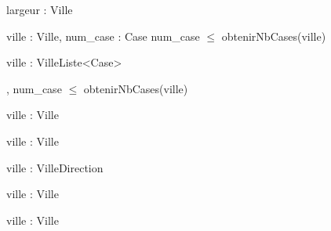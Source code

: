 \begin{algorithme}
        {largeur : \naturelNonNul}{Ville}

    \vspace{1.5em}

        {ville : Ville, num\_case : \naturelNonNul}{Case}
        {num\_case $\leq$ obtenirNbCases(ville)}

    \vspace{1.5em}

        {ville : Ville}{Liste<Case>}

    \vspace{1.5em}

        {, }
        {num\_case $\leq$ obtenirNbCases(ville)}

    \vspace{1.5em}

        {ville : Ville}{\naturelNonNul}

    \vspace{1.5em}

        {ville : Ville}{\naturelNonNul}

    \vspace{1.5em}

        {ville : Ville}{Direction}

    \vspace{1.5em}

        {ville : Ville}{\naturelNonNul}

    \vspace{1.5em}

        {ville : Ville}{\naturel}

\end{algorithme}